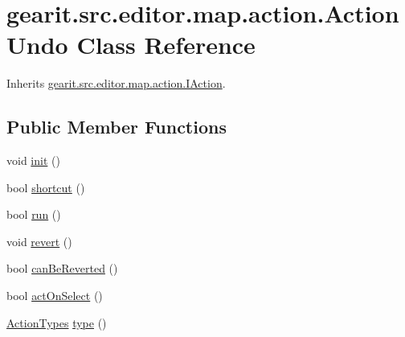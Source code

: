 \hypertarget{classgearit_1_1src_1_1editor_1_1map_1_1action_1_1_action_undo}{\section{gearit.\+src.\+editor.\+map.\+action.\+Action\+Undo Class Reference}
\label{classgearit_1_1src_1_1editor_1_1map_1_1action_1_1_action_undo}
}


Inherits \hyperlink{interfacegearit_1_1src_1_1editor_1_1map_1_1action_1_1_i_action}{gearit.\+src.\+editor.\+map.\+action.\+I\+Action}.

\subsection*{Public Member Functions}
\begin{DoxyCompactItemize}
\item 
void \hyperlink{classgearit_1_1src_1_1editor_1_1map_1_1action_1_1_action_undo_a43a4cedb732a165effac17b6ba02974e}{init} ()
\item 
bool \hyperlink{classgearit_1_1src_1_1editor_1_1map_1_1action_1_1_action_undo_a3f3b1f0652f33bd5099a8da029c00fda}{shortcut} ()
\item 
bool \hyperlink{classgearit_1_1src_1_1editor_1_1map_1_1action_1_1_action_undo_a97e5a5758c2b57a9280df72efc560b98}{run} ()
\item 
void \hyperlink{classgearit_1_1src_1_1editor_1_1map_1_1action_1_1_action_undo_af937d08faff6b23520c53e81dfcd2970}{revert} ()
\item 
bool \hyperlink{classgearit_1_1src_1_1editor_1_1map_1_1action_1_1_action_undo_a956a5afef60d3fd4514b28d3b3847283}{can\+Be\+Reverted} ()
\item 
bool \hyperlink{classgearit_1_1src_1_1editor_1_1map_1_1action_1_1_action_undo_a3670a9a9e9e2fc216ac916767717e43b}{act\+On\+Select} ()
\item 
\hyperlink{namespacegearit_1_1src_1_1editor_1_1map_1_1action_af036712a7d960b13d1e31954e65c00e3}{Action\+Types} \hyperlink{classgearit_1_1src_1_1editor_1_1map_1_1action_1_1_action_undo_a984f4a99ee6b115f89855be5fece8f91}{type} ()
\end{DoxyCompactItemize}


